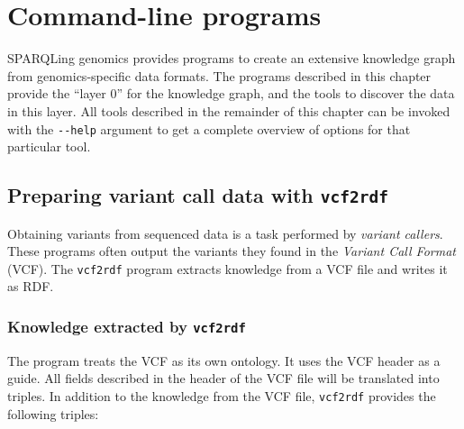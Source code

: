 \chapter{Command-line programs}
\label{chap:command-line}

  SPARQLing genomics provides programs to create an extensive knowledge graph
  from genomics-specific data formats.  The programs described in this chapter
  provide the ``layer 0'' for the knowledge graph, and the tools to discover
  the data in this layer.   All tools described in the remainder of this
  chapter can be invoked with the \texttt{-{}-help} argument to get a complete
  overview of options for that particular tool.

\section{Preparing variant call data with \texttt{vcf2rdf}}
\label{sec:vcf2rdf}

  Obtaining variants from sequenced data is a task performed by \emph{variant
    callers}.  These programs often output the variants they found in the
  \emph{Variant Call Format} (VCF).  The \texttt{vcf2rdf} program extracts
  knowledge from a VCF file and writes it as RDF.

\subsection{Knowledge extracted by \texttt{vcf2rdf}}

  The program treats the VCF as its own ontology.  It uses the VCF header as
  a guide.  All fields described in the header of the VCF file will be
  translated into triples.  In addition to the knowledge from the VCF file,
  \texttt{vcf2rdf} provides the following triples:

